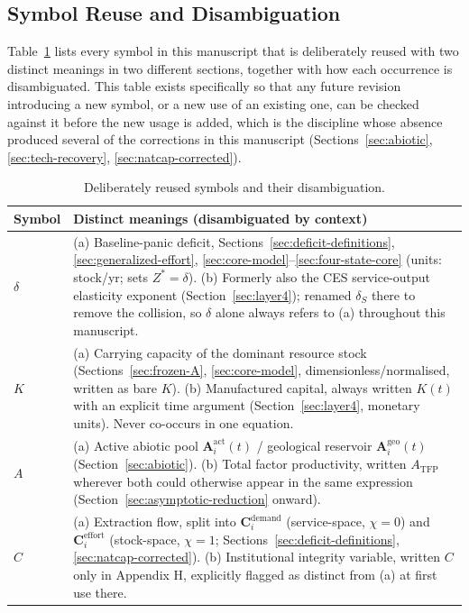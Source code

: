 \documentclass[twocolumn,10pt]{article}
\begin{document}
\subsection{Symbol Reuse and Disambiguation}
\label{sec:symbol-table}
Table~\ref{tab:symbol-reuse} lists every symbol in this manuscript that is deliberately reused with two distinct meanings in two different sections, together with how each occurrence is disambiguated. This table exists specifically so that any future revision introducing a new symbol, or a new use of an existing one, can be checked against it before the new usage is added, which is the discipline whose absence produced several of the corrections in this manuscript (Sections~\ref{sec:abiotic}, \ref{sec:tech-recovery}, \ref{sec:natcap-corrected}).
\begin{table}[h]
\centering
\small
\caption{Deliberately reused symbols and their disambiguation.}
\label{tab:symbol-reuse}
\begin{tabular}{lp{5.3cm}}
\toprule
\textbf{Symbol} & \textbf{Distinct meanings (disambiguated by context)} \\
\midrule
$\delta$ & (a) Baseline-panic deficit, Sections~\ref{sec:deficit-definitions}, \ref{sec:generalized-effort}, \ref{sec:core-model}--\ref{sec:four-state-core} (units: stock/yr; sets $Z^*=\delta$). (b) Formerly also the CES service-output elasticity exponent (Section~\ref{sec:layer4}); renamed $\delta_S$ there to remove the collision, so $\delta$ alone always refers to (a) throughout this manuscript. \\
$K$ & (a) Carrying capacity of the dominant resource stock (Sections~\ref{sec:frozen-A}, \ref{sec:core-model}, dimensionless/normalised, written as bare $K$). (b) Manufactured capital, always written $K(t)$ with an explicit time argument (Section~\ref{sec:layer4}, monetary units). Never co-occurs in one equation. \\
$A$ & (a) Active abiotic pool $\mathbf A^{\text{act}}_i(t)$ / geological reservoir $\mathbf A^{\text{geo}}_i(t)$ (Section~\ref{sec:abiotic}). (b) Total factor productivity, written $A_{\text{TFP}}$ wherever both could otherwise appear in the same expression (Section~\ref{sec:asymptotic-reduction} onward). \\
$C$ & (a) Extraction flow, split into $\mathbf C_i^{\text{demand}}$ (service-space, $\chi=0$) and $\mathbf C_i^{\text{effort}}$ (stock-space, $\chi=1$; Sections~\ref{sec:deficit-definitions}, \ref{sec:natcap-corrected}). (b) Institutional integrity variable, written $C$ only in Appendix H, explicitly flagged as distinct from (a) at first use there. \\

\end{tabular}
\end{table}
\end{document}
